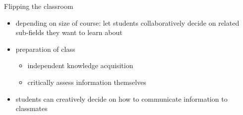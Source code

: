 \begin{frame}{Flipping the classroom}
	\pause
	\begin{itemize}[<+->]
		\item depending on size of course: let students \alert{collaboratively} decide on related sub-fields they want to learn about
		\item preparation of class
		\begin{itemize}
			\item independent \alert{knowledge acquisition}
			\item \alert{critically} assess information themselves
		\end{itemize}
		\item students can \alert{creatively} decide on how to \alert{communicate} information to classmates
	\end{itemize}
\end{frame}


